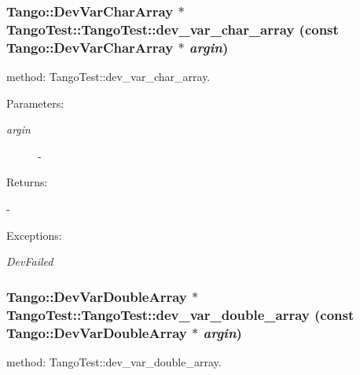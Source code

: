 \subsubsection{\setlength{\rightskip}{0pt plus 5cm}Tango::Dev\-Var\-Char\-Array $\ast$ Tango\-Test::Tango\-Test::dev\_\-var\_\-char\_\-array (const Tango::Dev\-Var\-Char\-Array $\ast$ {\em argin})}\label{classTangoTest_1_1TangoTest_z5_12}


method: Tango\-Test::dev\_\-var\_\-char\_\-array.

\begin{Desc}
\item[Parameters: ]\par
\begin{description}
\item[{\em 
argin}]- \end{description}
\end{Desc}
\begin{Desc}
\item[Returns: ]\par
- \end{Desc}
\begin{Desc}
\item[Exceptions: ]\par
\begin{description}
\item[{\em 
Dev\-Failed}] \end{description}
\end{Desc}
\subsubsection{\setlength{\rightskip}{0pt plus 5cm}Tango::Dev\-Var\-Double\-Array $\ast$ Tango\-Test::Tango\-Test::dev\_\-var\_\-double\_\-array (const Tango::Dev\-Var\-Double\-Array $\ast$ {\em argin})}\label{classTangoTest_1_1TangoTest_z5_18}


method: Tango\-Test::dev\_\-var\_\-double\_\-array.


